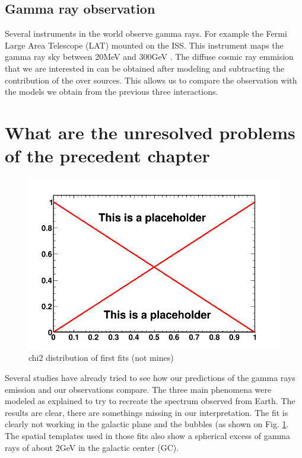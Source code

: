 \subsection{Gamma ray observation}

Several instruments in the world observe gamma rays. For example the Fermi Large Area Telescope (LAT) mounted on the ISS. This instrument maps the gamma ray sky between 20MeV and 300GeV . The diffuse cosmic ray emmision that we are interested in can be obtained after modeling and subtracting the contribution of the over sources. This allows us to compare the observation with the models we obtain from the previous three interactions.



\section{What are the unresolved problems of the precedent chapter}
%	

\begin{figure}
 \centering
 \includegraphics[width=.9\linewidth]{pic/dummy.png}
 \caption{chi2 distribution of first fits (not mines)}
 \label{fig:first_BKGonly_fits}
\end{figure}

Several studies have already tried to see how our predictions of the gamma rays emission and our observations compare. The three main phenomena were modeled as explained to try to recreate the spectrum observed from Earth. The results are clear, there are somethings missing in our interpretation. 
The fit is clearly not working in the galactic plane and the bubbles (as shown on Fig. \ref{fig:first_BKGonly_fits}. The spatial templates used in those fits also show a spherical excess of gamma rays of about 2GeV in the galactic center (GC).

